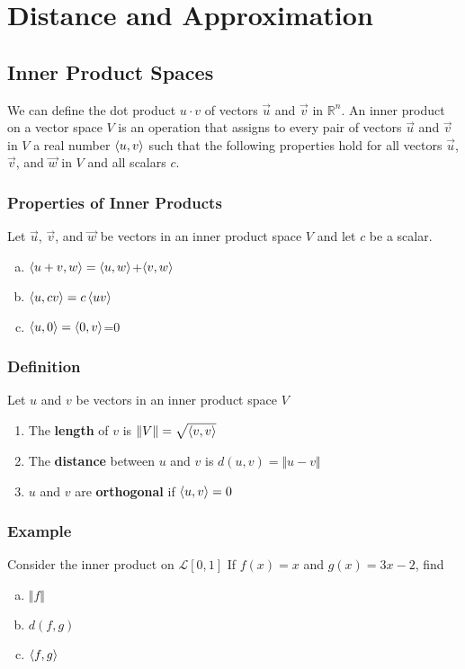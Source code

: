 \chapter{Distance and Approximation}

\section{Inner Product Spaces}
We can define the dot product $u\cdot v$ of vectors $\vec{u}$ and $\vec{v}$ in $\mathbb{R}^n$.
An inner product on a vector space $V$ is an operation that assigns to every pair
of vectors $\vec{u}$ and $\vec{v}$ in $V$ a real number $\ev{u,v}$ such that the
following properties hold for all vectors $\vec{u}$, $\vec{v}$, and $\vec{w}$
in $V$ and all scalars $c$.

\subsection*{Properties of Inner Products}
Let $\vec{u}$, $\vec{v}$, and $\vec{w}$ be vectors in an inner product space
$V$ and let $c$ be a scalar.
\begin{enumerate}[(a)]
    \item $\ev{u+v,w}=\ev{u,w}$+$\ev{v,w}$
    \item $\ev{u,cv}=c\ev{uv}$
    \item $\ev{u,0}=\ev{0,v}$=0
\end{enumerate}

\subsection*{Definition}
Let $u$ and $v$ be vectors in an inner product space $V$
\begin{enumerate}
    \item The \textbf{length} of $v$ is $\Vert{V\Vert}=\sqrt{\ev{v,v}}$
    \item The \textbf{distance} between $u$ and $v$ is $d(u,v)=\Vert{u-v}\Vert$
    \item $u$ and $v$ are \textbf{orthogonal} if $\ev{u,v}=0$
\end{enumerate}

\subsection*{Example}
Consider the inner product on $\mathscr{L}[0,1]$ If $f(x)=x$ and $g(x)=3x-2$, find
\begin{enumerate}[(a)]
    \item $\Vert{f}\Vert$
    \item $d(f,g)$
    \item $\ev{f,g}$
\end{enumerate}

